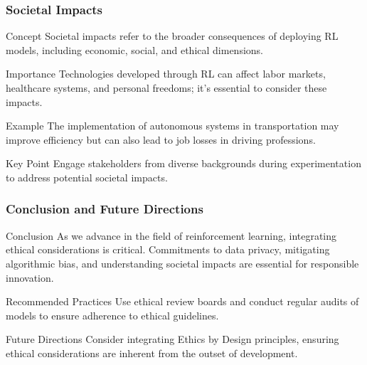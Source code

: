 \documentclass[aspectratio=169]{beamer}
\begin{document}
\begin{frame}[fragile]
    \frametitle{Societal Impacts}
    \begin{block}{Concept}
        Societal impacts refer to the broader consequences of deploying RL models, including economic, social, and ethical dimensions.
    \end{block}
    \begin{block}{Importance}
        Technologies developed through RL can affect labor markets, healthcare systems, and personal freedoms; it's essential to consider these impacts.
    \end{block}
    \begin{block}{Example}
        The implementation of autonomous systems in transportation may improve efficiency but can also lead to job losses in driving professions.
    \end{block}
    \begin{block}{Key Point}
        Engage stakeholders from diverse backgrounds during experimentation to address potential societal impacts.
    \end{block}
\end{frame}

\begin{frame}[fragile]
    \frametitle{Conclusion and Future Directions}
    \begin{block}{Conclusion}
        As we advance in the field of reinforcement learning, integrating ethical considerations is critical. Commitments to data privacy, mitigating algorithmic bias, and understanding societal impacts are essential for responsible innovation.
    \end{block}
    \begin{block}{Recommended Practices}
        Use ethical review boards and conduct regular audits of models to ensure adherence to ethical guidelines.
    \end{block}
    \begin{block}{Future Directions}
        Consider integrating Ethics by Design principles, ensuring ethical considerations are inherent from the outset of development.
    \end{block}
\end{frame}
\end{document}
